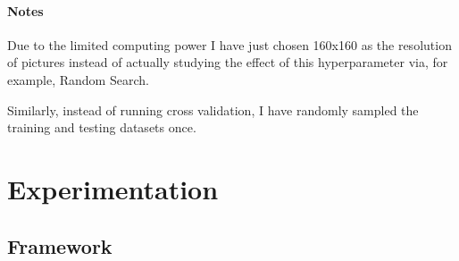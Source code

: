 \documentclass[a4paper]{article}
\begin{document}
\paragraph{Notes} Due to the limited computing power I have just chosen 160x160 as the resolution of pictures instead of actually studying the effect of this hyperparameter via, for example, Random Search. 

Similarly, instead of running cross validation, I have randomly sampled the training and testing datasets once.
\newpage
\section{Experimentation}
\subsection{Framework}
\end{document}

